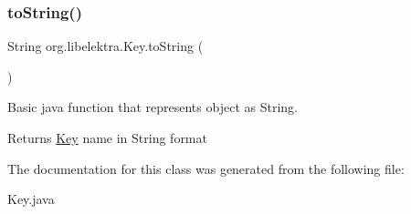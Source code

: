 \subsubsection{\texorpdfstring{toString()}{toString()}}
{\footnotesize\ttfamily String org.\+libelektra.\+Key.\+to\+String (\begin{DoxyParamCaption}{ }\end{DoxyParamCaption})\hspace{0.3cm}{\ttfamily [inline]}}



Basic java function that represents object as String. 

\begin{DoxyReturn}{Returns}
\mbox{\hyperlink{classorg_1_1libelektra_1_1Key}{Key}} name in String format 
\end{DoxyReturn}


The documentation for this class was generated from the following file\+:\begin{DoxyCompactItemize}
\item 
Key.\+java\end{DoxyCompactItemize}
